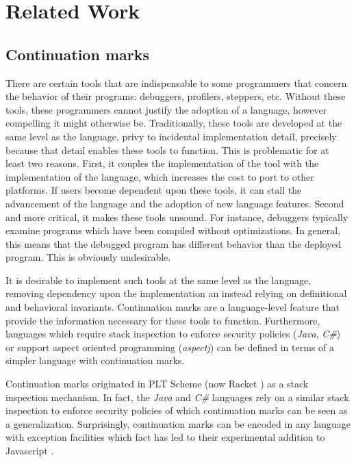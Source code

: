 \documentclass[ms]{byuprop}
\newcounter{definition}
\begin{document}
\section{Related Work}

\subsection{Continuation marks}

There are certain tools that are indispensable to some programmers that concern the
behavior of their programs: debuggers, profilers, steppers, etc. Without these tools,
these programmers cannot justify the adoption of a language, however compelling it might
otherwise be. Traditionally, these tools are developed at the same level as the 
language, privy to incidental implementation detail, precisely because that detail 
enables these tools to function. This is problematic for at least two reasons. First, 
it couples the implementation of the tool with the implementation of the language, which
increases the cost to port to other platforms. If users become dependent upon these tools,
it can stall the advancement of the language and the adoption of new language features.
Second and more critical, it makes these tools unsound. For instance, debuggers typically
examine programs which have been compiled without optimizations. In general, this means 
that the debugged program has different behavior than the deployed program. This is 
obviously undesirable.

It is desirable to implement such tools at the same level as the language, removing
dependency upon the implementation an instead relying on definitional and behavioral
invariants. Continuation marks are a language-level feature that provide the information
necessary for these tools to function. Furthermore, languages which require stack
inspection to enforce security policies (\emph{Java}, \emph{C\#}) or support aspect
oriented programming (\emph{aspectj}) can be defined in terms of a simpler language with
continuation marks.

Continuation marks originated in PLT Scheme (now Racket \cite{plt-tr1}) as a stack 
inspection mechanism. In fact, the \emph{Java} and \emph{C\#} languages rely on a similar 
stack inspection to enforce security policies of which continuation marks can be seen as 
a generalization. Surprisingly, continuation marks can be encoded in any language with 
exception facilities \cite{pettyjohn2005continuations} which fact has led to their 
experimental addition to Javascript \cite{clements2008implementing}.
\end{document}
